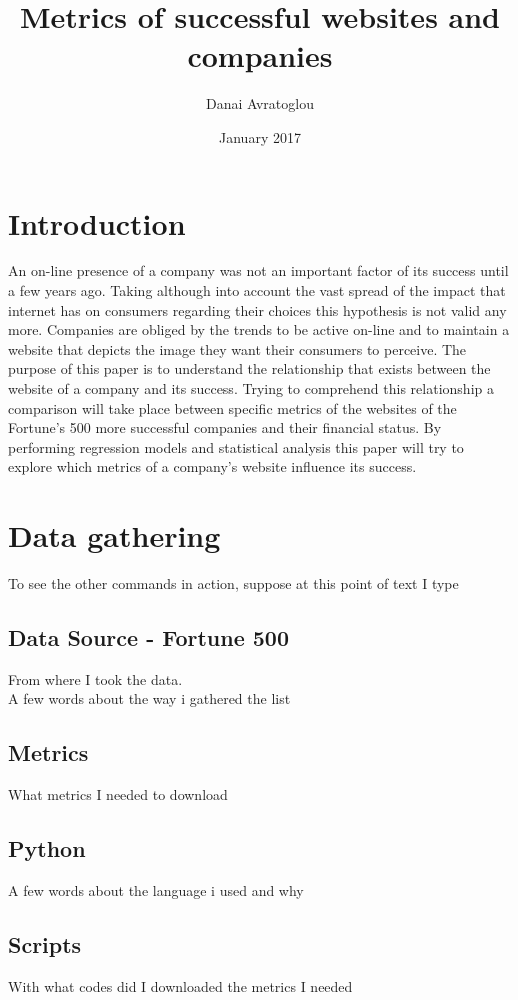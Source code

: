 \documentclass{article}
\begin{document}
\title{Metrics of successful websites and companies}
\author{Danai Avratoglou}
\date{January 2017}
\maketitle
\pagebreak 
\tableofcontents
\pagebreak  
\section{Introduction}
 
An on-line presence of a company was not an important factor of its success until a few years ago. Taking although into account the vast spread of the impact that internet has on consumers regarding their choices this hypothesis is not valid any more. Companies are obliged by the trends to be active on-line and to maintain a website that depicts the image they want their consumers to perceive. The purpose of this paper is to understand the relationship that exists between the website of a company and its success. Trying to comprehend this relationship a comparison will take place between specific metrics of the websites of the Fortune's 500 more successful companies  and their financial status. By performing regression models and statistical analysis this paper will try to explore which metrics of a company's website influence its success.   
 
\pagebreak 
\section{Data gathering}
To see the other commands in action, suppose at this point of text I type
\subsection{Data Source - Fortune 500}
From where I took the data. \\ 
A few words about the way i gathered the list
\subsection{Metrics}
What metrics I needed to download
\subsection{Python}
A few words about the language i used and why
\subsection{Scripts}
With what codes did I downloaded the metrics I needed
\end{document}
